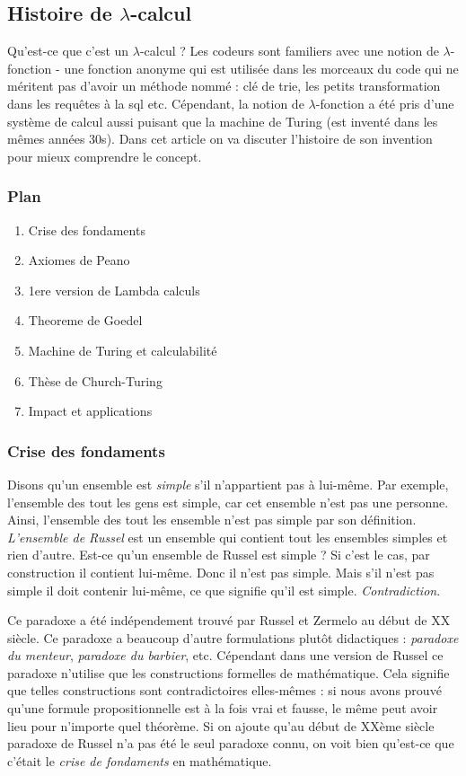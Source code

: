 \documentclass[12pt, a4paper]{article}
\begin{document}
\subsection*{Histoire de $\lambda$-calcul}

Qu'est-ce que c'est un $\lambda$-calcul ?
Les codeurs sont familiers avec une notion de $\lambda$-fonction - une fonction anonyme qui est utilisée dans les morceaux du code qui ne méritent pas d'avoir un méthode nommé : clé de trie, les petits transformation dans les requêtes à la sql etc.
Cépendant, la notion de $\lambda$-fonction a été pris d'une système de calcul aussi puisant que la machine de Turing (est inventé dans les mêmes années 30s).
Dans cet article on va discuter l'histoire de son invention pour mieux comprendre le concept.

\subsubsection*{Plan}
\begin{enumerate}
	\item Crise des fondaments
	\item Axiomes de Peano
	\item 1ere version de Lambda calculs
	\item Theoreme de Goedel
	\item Machine de Turing et calculabilité
	\item Thèse de Church-Turing
	\item Impact et applications
\end{enumerate}


\subsubsection*{Crise des fondaments}
Disons qu'un ensemble est \emph{simple} s'il n'appartient pas à lui-même. Par exemple, l'ensemble des tout les gens est simple, car cet ensemble n'est pas une personne. Ainsi, l'ensemble des tout les ensemble n'est pas simple par son définition. \emph{L'ensemble de Russel} est un ensemble qui contient tout les ensembles simples et rien d'autre.
Est-ce qu'un ensemble de Russel est simple ? Si c'est le cas, par construction il contient lui-même. Donc il n'est pas simple. Mais s'il n'est pas simple il doit contenir lui-même, ce que signifie qu'il est simple. \emph{Contradiction}.

Ce paradoxe a été indépendement trouvé par Russel et Zermelo au début de XX siècle. Ce paradoxe a beaucoup d'autre formulations plutôt didactiques : \emph{paradoxe du menteur}, \emph{paradoxe du barbier}, etc. 
Cépendant dans une version de Russel ce paradoxe n'utilise que les constructions formelles de mathématique. Cela signifie que telles constructions sont contradictoires elles-mêmes : si nous avons prouvé qu'une formule propositionnelle est à la fois vrai et fausse, le même peut avoir lieu pour n'importe quel théorème.
Si on ajoute qu'au début de XXème siècle paradoxe de Russel n'a pas été le seul paradoxe connu, on voit bien qu'est-ce que c'était le \emph{crise de fondaments} en mathématique.
\end{document}
